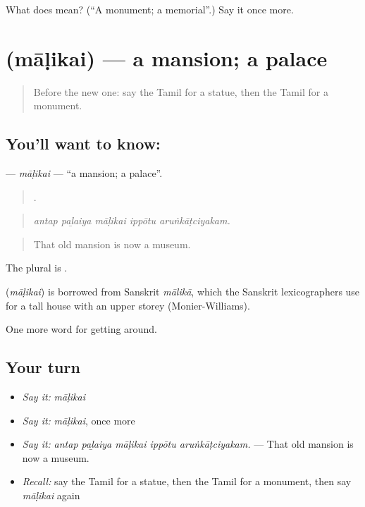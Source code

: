 \begin{tcolorbox}[breakable,colback=teal!4,colframe=teal!35!black,title={Before you move on}]
What does  mean? (\textquotedblleft{}A monument; a memorial\textquotedblright{}.) Say it once more.
\end{tcolorbox}
\section[\texorpdfstring{\ta{மாளிகை} (māḷikai)}{மாளிகை (māḷikai)}]{ (māḷikai) — a mansion; a palace}

\label{lesson:TA-C424-malikai}



\begin{quote}
Before the new one: say the Tamil for a statue, then the Tamil for a monument.
\end{quote}

\subsection*{You'll want to know: }
\textbf{} — \emph{māḷikai} — \textquotedblleft{}a mansion; a palace\textquotedblright{}.

\begin{quote}
    .
\end{quote}

\begin{quote}
\emph{antap paḻaiya māḷikai ippōtu aruṅkāṭciyakam.}
\end{quote}

\begin{quote}
That old mansion is now a museum.
\end{quote}

The plural is .

\begin{cousinweb}
\textbf{} (\emph{māḷikai}) is borrowed from Sanskrit \emph{mālikā}, which the Sanskrit lexicographers use for a tall house with an upper storey (Monier-Williams).
\end{cousinweb}

\begin{grammarlens}[title={What you've built}]
One more word for getting around.
\end{grammarlens}

\subsection*{Your turn}
\begin{itemize}
\raggedright
  \item \emph{Say it:} \emph{māḷikai}
  \item \emph{Say it:} \emph{māḷikai}, once more
  \item \emph{Say it:} \emph{antap paḻaiya māḷikai ippōtu aruṅkāṭciyakam.} — That old mansion is now a museum.
  \item \emph{Recall:} say the Tamil for a statue, then the Tamil for a monument, then say \emph{māḷikai} again
\end{itemize}

